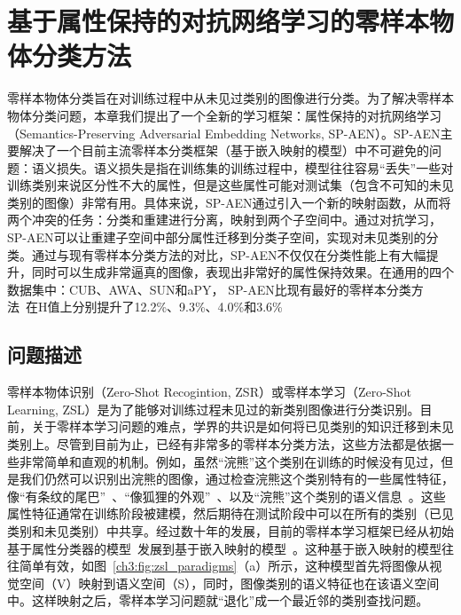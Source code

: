 \chapter{基于属性保持的对抗网络学习的零样本物体分类方法}


零样本物体分类旨在对训练过程中从未见过类别的图像进行分类。为了解决零样本物体分类问题，本章我们提出了一个全新的学习框架：属性保持的对抗网络学习（Semantics-Preserving Adversarial Embedding Networks, SP-AEN）。SP-AEN主要解决了一个目前主流零样本分类框架（基于嵌入映射的模型）中不可避免的问题：语义损失。语义损失是指在训练集的训练过程中，模型往往容易“丢失”一些对训练类别来说区分性不大的属性，但是这些属性可能对测试集（包含不可知的未见类别的图像）非常有用。具体来说，SP-AEN通过引入一个新的映射函数，从而将两个冲突的任务：分类和重建进行分离，映射到两个子空间中。通过对抗学习，SP-AEN可以让重建子空间中部分属性迁移到分类子空间，实现对未见类别的分类。通过与现有零样本分类方法的对比，SP-AEN不仅仅在分类性能上有大幅提升，同时可以生成非常逼真的图像，表现出非常好的属性保持效果。在通用的四个数据集中：CUB、AWA、SUN和aPY， SP-AEN比现有最好的零样本分类方法~\cite{xian2017zero}在H值上分别提升了12.2\%、9.3\%、4.0\%和3.6\%


\section{问题描述}


零样本物体识别（Zero-Shot Recogintion, ZSR）或零样本学习（Zero-Shot Learning, ZSL）是为了能够对训练过程未见过的新类别图像进行分类识别。目前，关于零样本学习问题的难点，学界的共识是如何将已见类别的知识迁移到未见类别上。尽管到目前为止，已经有非常多的零样本分类方法，这些方法都是依据一些非常简单和直观的机制。例如，虽然“浣熊”这个类别在训练的时候没有见过，但是我们仍然可以识别出浣熊的图像，通过检查浣熊这个类别特有的一些属性特征，像“有条纹的尾巴”~\cite{farhadi2009describing,lampert2009learning,zhang2013attribute,li2010object}、“像狐狸的外观”~\cite{torresani2010efficient,li2010object}、以及“浣熊”这个类别的语义信息~\cite{pennington2014glove,mikolov2013distributed}。这些属性特征通常在训练阶段被建模，然后期待在测试阶段中可以在所有的类别（已见类别和未见类别）中共享。经过数十年的发展，目前的零样本学习框架已经从初始基于属性分类器的模型~\cite{lampert2009learning}发展到基于嵌入映射的模型~\cite{akata2015label,frome2013devise,weston2010large}。这种基于嵌入映射的模型往往简单有效，如图~\ref{ch3:fig:zsl_paradigms}（a）所示，这种模型首先将图像从视觉空间（V）映射到语义空间（S），同时，图像类别的语义特征也在该语义空间中。这样映射之后，零样本学习问题就“退化”成一个最近邻的类别查找问题。

